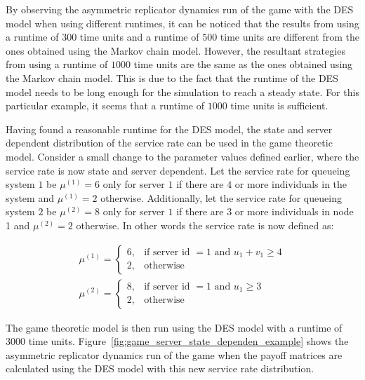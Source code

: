 By observing the asymmetric replicator dynamics run of the game with the DES
model when using different runtimes, it can be noticed that the results from
using a runtime of \(300\) time units and a runtime of \(500\) time units are
different from the ones obtained using the Markov chain model.
However, the resultant strategies from using a runtime of \(1000\) time units
are the same as the ones obtained using the Markov chain model.
This is due to the fact that the runtime of the DES model needs to be long
enough for the simulation to reach a steady state.
For this particular example, it seems that a runtime of \(1000\) time units is
sufficient.


Having found a reasonable runtime for the DES model, the state and server
dependent distribution of the service rate can be used in the game theoretic
model.
Consider a small change to the parameter values defined earlier, where the
service rate is now state and server dependent.
Let the service rate for queueing system \(1\) be \(\mu^{(1)} = 6\) only for
server \(1\) if there are \(4\) or more individuals in the system
and \(\mu^{(1)} = 2\) otherwise.
Additionally, let the service rate for queueing system \(2\) be
\(\mu^{(2)} = 8\) only for server \(1\) if there are \(3\) or more
individuals in node 1 and \(\mu^{(2)} = 2\) otherwise.
In other words the service rate is now defined as:

\begin{align}
    \mu^{(1)} =
    \begin{cases}
        6, & \text{if server id \(= 1\) and } u_1 + v_1 \geq 4 \\
        2, & \text{otherwise}
    \end{cases} \\
    \mu^{(2)} =
    \begin{cases}
        8, & \text{if server id \(= 1\) and } u_1 \geq 3 \\
        2, & \text{otherwise}
    \end{cases}
\end{align}

The game theoretic model is then run using the DES model with a runtime of
\(3000\) time units.
Figure~\ref{fig:game_server_state_dependen_example} shows the asymmetric
replicator dynamics run of the game when the payoff matrices are calculated
using the DES model with this new service rate distribution.

